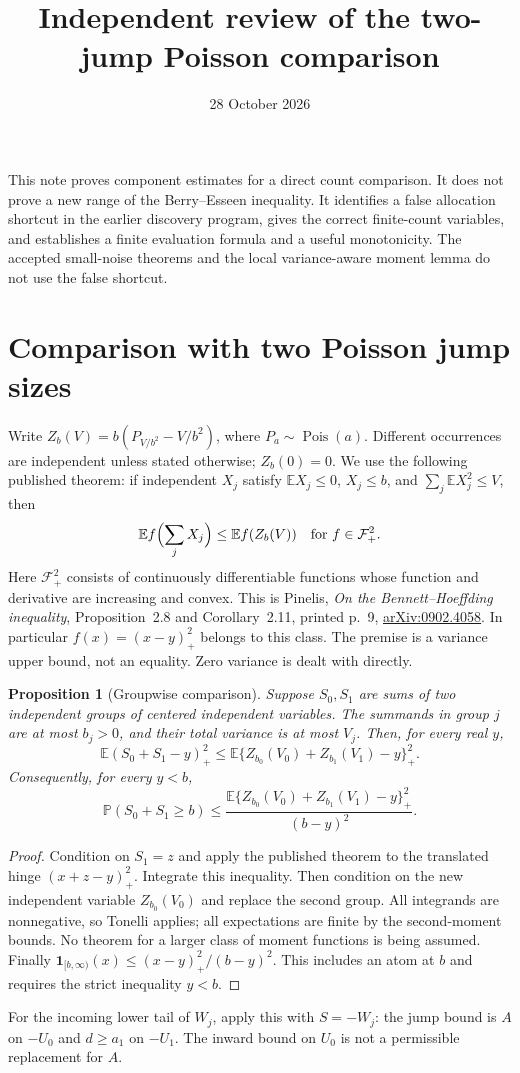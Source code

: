 \documentclass[11pt]{article}
\title{Independent review of the two-jump Poisson comparison}
\author{}
\date{28 October 2026}
\newtheorem{proposition}{Proposition}
\newcommand{\E}{\mathbb E}
\newcommand{\Pp}{\mathbb P}
\newcommand{\Pois}{\operatorname{Pois}}
\newcommand{\1}{\mathbf1}
\begin{document}
\maketitle

This note proves component estimates for a direct count comparison. It does
not prove a new range of the Berry--Esseen inequality. It identifies a false
allocation shortcut in the earlier discovery program, gives the correct
finite-count variables, and establishes a finite evaluation formula and a
useful monotonicity. The accepted small-noise theorems and the local
variance-aware moment lemma do not use the false shortcut.

\section{Comparison with two Poisson jump sizes}
Write $Z_b(V)=b(P_{V/b^2}-V/b^2)$, where $P_a\sim\Pois(a)$.
Different occurrences are independent unless stated otherwise; $Z_b(0)=0$.
We use the following published theorem: if independent $X_j$ satisfy
$\E X_j\le0$, $X_j\le b$, and $\sum_j\E X_j^2\le V$, then
\[
 \E f\Bigl(\sum_jX_j\Bigr)\le\E f(Z_b(V))
 \quad\text{for } f\in\mathcal F^2_+.
\]
Here $\mathcal F^2_+$ consists of continuously differentiable functions
whose function and derivative are increasing and convex. This is
Pinelis, \emph{On the Bennett--Hoeffding inequality}, Proposition~2.8
and Corollary~2.11, printed p.~9,
\href{https://arxiv.org/pdf/0902.4058}{arXiv:0902.4058}.
In particular $f(x)=(x-y)_+^2$ belongs to this class. The premise is a
variance upper bound, not an equality. Zero variance is dealt with directly.

\begin{proposition}[Groupwise comparison]
Suppose $S_0,S_1$ are sums of two independent groups of centered independent
variables. The summands in group $j$ are at most $b_j>0$, and their total
variance is at most $V_j$. Then, for every real $y$,
\begin{equation}\label{eq:groups}
 \E(S_0+S_1-y)_+^2
 \le \E\{Z_{b_0}(V_0)+Z_{b_1}(V_1)-y\}_+^2.
\end{equation}
Consequently, for every $y<b$,
\begin{equation}\label{eq:closed}
 \Pp(S_0+S_1\ge b)
 \le \frac{\E\{Z_{b_0}(V_0)+Z_{b_1}(V_1)-y\}_+^2}{(b-y)^2}.
\end{equation}
\end{proposition}
\begin{proof}
Condition on $S_1=z$ and apply the published theorem to the translated
hinge $(x+z-y)_+^2$. Integrate this inequality. Then condition on the
new independent variable $Z_{b_0}(V_0)$ and replace the second group.
All integrands are nonnegative, so Tonelli applies; all expectations
are finite by the second-moment bounds. No theorem for a larger class
of moment functions is being assumed. Finally
$\1_{[b,\infty)}(x)\le (x-y)_+^2/(b-y)^2$. This includes an atom at
$b$ and requires the strict inequality $y<b$.
\end{proof}
For the incoming lower tail of $W_j$, apply this with $S=-W_j$:
the jump bound is $A$ on $-U_0$ and $d\ge a_1$ on $-U_1$.
The inward bound on $U_0$ is not a permissible replacement for $A$.
\end{document}

